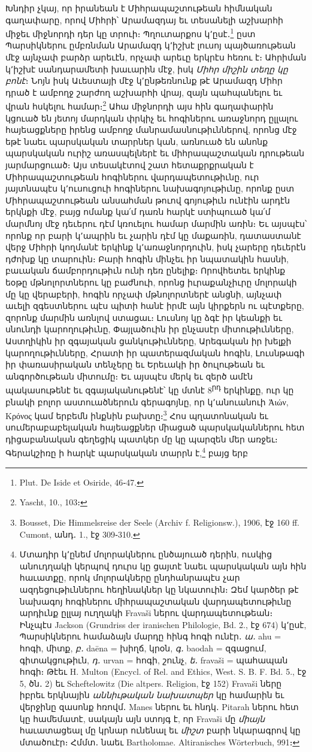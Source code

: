\documentclass{article}
\begin{document}
{Խնդիր չկայ, որ իրանեան է Միհրապաշտութեան հիմնական գաղափարը, որով Միհրի՝ Արամազդայ եւ տեսանելի աշխարհի միջեւ միջնորդի դեր կը տրուի։ Պղուտարքոս կ՚ըսէ․\footnote{Plut. De Iside et Osiride, 46֊47.} ըստ Պարսիկներու ըմբռնման Արամազդ կ՚իշխէ լուսոյ պայծառութեան մէջ այնչափ բարձր արեւէն, որչափ արեւը երկրէս հեռու է։ Ահրիման կ՚իշխէ սանդարամետի խաւարին մէջ, իսկ \emph{Միհր միշին տեղը կը բոնէ}։ Նոյն իսկ Աւեստայի մէջ կ՚ընթեռնունք թէ Արամազդ Միհր դրած է ամբողջ շարժող աշխարհի վրայ, զայն պահպանելու եւ վրան հսկելու համար։\footnote{Yascht, 10., 103։} Ահա միջնորդի այս հին գաղափարին կցուած են յետոյ մարդկան փրկիչ եւ հոգիներու առաջնորդ ըլլալու հայեացքները իրենց ամբողջ մանրամասնութիւններով, որոնց մէջ եթէ նաեւ պարսկական տարրներ կան, առնուած են անոնք պարսկական ուրիշ առասպելներէ եւ միհրապաշտական դրութեան յարմարցուած։ Այս տեսակէտով շատ հետաքրքրական է Միհրապաշտութեան հոգիներու վարդապետութիւնը, ուր յայտնապէս կ՚ուսուցուի հոգիներու նախագոյութիւնը, որոնք ըստ Միհրապաշտութեան անսահման թուով գոյութիւն ունէին արդէն երկնքի մէջ, բայց ոմանք կա՛մ դառն հարկէ ստիպուած կա՛մ մարմնոյ մէջ դեւերու դէմ կռուելու համար մարմին առին։ Եւ այսպէս՝ որոնք որ բարի կ՚ապրին եւ չարին դէմ կը մաքառին, դատաստանէ վերջ Միհրի կողմանէ երկինք կ՚առաջնորդուին, իսկ չարերը դեւերէն դժոխք կը տարուին։ Բարի հոգին մինչեւ իր նպատակին հասնի, բաւական ճամբորդութիւն ունի դեռ ընելիք։ Որովհետեւ երկինք եօթը մթնոլորտներու կը բաժնուի, որոնց իւրաքանչիւրը մոլորակի մը կը վերաբերի, հոգին որչափ մթնոլորտներէ անցնի, այնչափ աւելի զգեստներու պէս պիտի հանէ իրմէ այն կիրքերն ու պէտքերը, զորոնք մարմին առնլով ստացաւ։ Լուսնոյ կը ձգէ իր կեանքի եւ սնունդի կարողութիւնը, Փայլածուին իր ընչասէր միտութիւնները, Աստղիկին իր զգայական ցանկութիւնները, Արեգական իր խելքի կարողութիւնները, Հրատի իր պատերազմական հոգին, Լուսնթագի իր փառասիրական տենչերը եւ Երեւակի իր ծուլութեան եւ անգործութեան միտումը։ Եւ այսպէս մերկ եւ զերծ ամէն պակասութենէ եւ զգայականութենէ՝ կը մտնէ 8\textsuperscript{րդ} երկինքը, ուր կը բնակի բոլոր աստուածներուն գերագոյնը, որ կ՚անուանուի Ἀιών, Κρόνος կամ երբեմն ինքնին բախտը։\footnote{Bousset, Die Himmelsreise der Seele (Archiv f. Religionsw.), 1906, էջ 160 ff. Cumont, անդ․ 1., էջ 309֊310.} Հոս պղատոնական եւ սումերաբաբելական հայեացքներ միացած պարսկականներու հետ դիցաբանական գեղեցիկ պատկեր մը կը պարզեն մեր առջեւ։ Գերակշիռը ի հարկէ պարսկական տարրն է,\footnote{Մտադիր կ՚ընեմ մոլորակներու ընծայուած դերին, ուսկից անուդղակի կերպով դուրս կը ցայտէ նաեւ պարսկական այն հին հաւատքը, որոկ մոլորակները ընդհանրապէս չար ազդեցութիւններու հեղինակներ կը նկատուին։ Զեմ կարծեր թէ նախագոյ հոգիներու միհրապաշտական վարդապետութիւնը արդիւնք ըլլայ ուղղակի Fravaši ներու վարդապետութեան։ Ինչպէս Jackson (Grundriss der iranischen Philologie, Bd. 2., էջ 674) կ՚ըսէ, Պարսիկներու համաձայն մարդը հինգ հոգի ունէր․ \emph{ա․} ahu = հոգի, միտք, \emph{բ․} daēna = խիղճ, կրօն, \emph{գ․} baodah = զգացում, գիտակցութիւն, \emph{դ․} urvan = հոգի, շունչ, \emph{ե․} fravaši = պահապան հոգի։ Թէեւ H. Multon (Encycl. of Rel. and Ethics, West. S. B. F. Bd. 5., էջ 5, ծն․ 2) եւ Scheftelowitz (Die altpers. Religion, էջ 152) Fravaši ները իբրեւ երկնային \emph{աննիւթական նախատպեր} կը համարին եւ վերջինը զասոնք հռովմ․ Manes ներու եւ հնդկ․ Pitarah ներու հետ կը համեմատէ, սակայն այն ստոյգ է, որ Fravaši մը \emph{միայն} հաւատացեալ մը կրնար ունենալ եւ \emph{միշտ} բարի նկարագրով կը մտածուէր։ Հմմտ․ նաեւ Bartholomae. Altiranisches Wörterbuch, 991։} բայց երբ }
\end{document}
